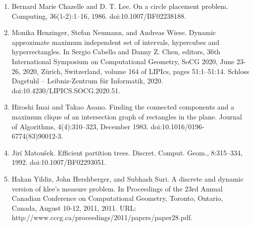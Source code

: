 \begin{enumerate}
\item[]  [12]  Bernard Marie Chazelle and D. T. Lee.  On a circle placement problem.  Computing, 36(1-2):1–16, 1986.  doi:10.1007/BF02238188.  
\item[]  [13]  Monika Henzinger, Stefan Neumann, and Andreas Wiese.  Dynamic approximate maximum independent set of intervals, hypercubes and hyperrectangles.  In Sergio Cabello and Danny Z. Chen, editors, 36th International Symposium on Computational Geometry, SoCG 2020, June 23-26, 2020, Zürich, Switzerland, volume 164 of LIPIcs, pages 51:1–51:14. Schloss Dagstuhl – Leibniz-Zentrum für Informatik, 2020.  doi:10.4230/LIPICS.SOCG.2020.51.  
\item[]  [14]  Hiroshi Imai and Takao Asano.  Finding the connected components and a maximum clique of an intersection graph of rectangles in the plane.  Journal of Algorithms, 4(4):310–323, December 1983.  doi:10.1016/0196-6774(83)90012-3.  
\item[]  [15]  Jirí Matoušek.  Efficient partition trees.  Discret. Comput. Geom., 8:315–334, 1992.  doi:10.1007/BF02293051.  
\item[]  [16]  Hakan Yildiz, John Hershberger, and Subhash Suri.  A discrete and dynamic version of klee’s measure problem.  In Proceedings of the 23rd Annual Canadian Conference on Computational Geometry, Toronto, Ontario, Canada, August 10-12, 2011, 2011.  URL: http://www.cccg.ca/proceedings/2011/papers/paper28.pdf.  
\end{enumerate}
